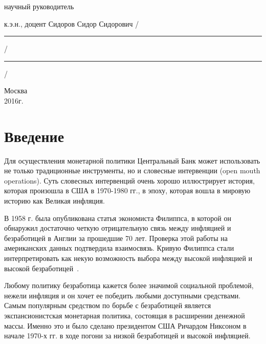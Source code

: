 \documentclass[14pt,a4paper, oneside]{extreport}
\begin{document}
\noindent
научный руководитель


\noindent
к.э.н., доцент Сидоров Сидор Сидорович 
\hfill /\rule{6em}{0.5pt}/\rule{6em}{0.5pt}/

\hfill{}



%
%



\vfill\vfill

\begin{center}
\normalsize Москва\\ 2016г.
\end{center}
\normalsize

\newpage

\thispagestyle{fancy}

\tableofcontents


      


\chapter*{Введение}


Для осуществления монетарной политики Центральный Банк может использовать не только традиционные инструменты, но и словесные интервенции (open mouth operations). Суть словесных интервенций очень хорошо иллюстрирует история, которая произошла в США в 1970-1980 гг., в эпоху, которая вошла в мировую историю как Великая инфляция. 

В 1958 г. была опубликована статья экономиста Филиппса, в которой он обнаружил достаточно четкую отрицательную связь между инфляцией и безработицей в Англии за прошедшие 70 лет. Проверка этой работы на американских данных подтвердила взаимосвязь. Кривую Филиппса стали интерпретировать как некую возможность выбора между высокой инфляцией и высокой безработицей~\cite{phillips1958relation}.

Любому политику безработица кажется более значимой социальной проблемой, нежели инфляция и он хочет ее победить любыми доступными средствами. Самым популярным средством по борьбе с безработицей является экспансионистская монетарная политика, состоящая в расширении денежной массы. Именно это и было сделано президентом США Ричардом Никсоном в начале 1970-х гг. в ходе погони за низкой безработицей и высокой инфляцией.
\end{document}
